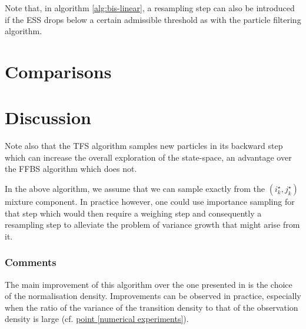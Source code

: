 Note that, in algorithm \ref{alg:bis-linear}, a resampling step can also be introduced if the ESS drops below a certain admissible threshold as with the particle filtering algorithm.



\section{Comparisons}

\section{Discussion}
Note also that the TFS algorithm samples new particles in its backward step which can increase the overall exploration of the state-space, an advantage over the FFBS algorithm which does not. 


In the above algorithm, we assume that we can sample exactly from the $(i^{\star}_{k},j^{\star}_{k})$ mixture component. In practice however, one could use importance sampling for that step which would then require a weighing step and consequently a resampling step to alleviate the problem of variance growth that might arise from it.
\subsubsection{Comments}
The main improvement of this algorithm over the one presented in \cite{fearnhead10} is the choice of the normalisation density. Improvements can be observed in practice, especially when the ratio of the variance of the transition density to that of the observation density is large (cf. \hyperref[numerical experiments]{point \ref*{numerical experiments}}).\\


